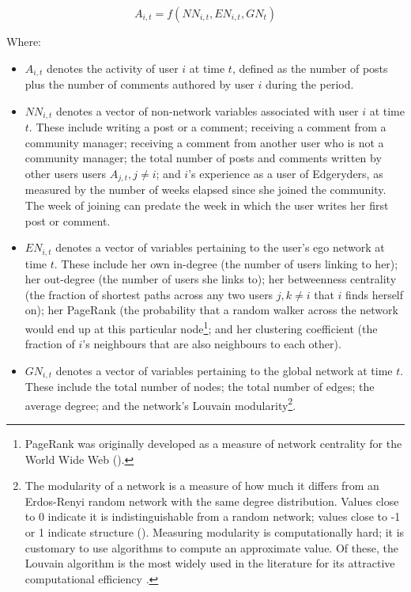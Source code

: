 \begin{equation}
	A_{i,t} = f(NN_{i,t}, EN_{i,t}, GN_t) 
	\label{eq:model}
\end{equation}

Where:
\begin{itemize}
\item $A_{i,t}$ denotes the activity of user $i$ at time $t$, defined as the number of posts plus the number of comments authored by user $i$ during the period.
\item $NN_{i,t}$ denotes a vector of non-network variables associated with user $i$ at time $t$. These include writing a post or a comment; receiving a comment from a community manager; receiving a comment from another user who is not a community manager; the total number of posts and comments written by other users users $A_{j,t}, j \neq i$; and $i$'s experience as a user of Edgeryders, as measured by the number of weeks elapsed since she joined the community. The week of joining can predate the week in which the user writes her first post or comment. 
\item $EN_{i, t}$ denotes a vector of variables pertaining to the user's ego network at time $t$. These include her own in-degree (the number of users linking to her); her out-degree (the number of users she links to); her betweenness centrality (the fraction of shortest paths across any two users $j,k \neq i$ that $i$ finds herself on); her PageRank (the probability that a random walker across the network would end up at this particular node\footnote{PageRank was originally developed as a measure of network centrality for the World Wide Web (\cite{brin2012reprint}).}; and her clustering coefficient (the fraction of $i$'s neighbours that are also neighbours to each other).
\item $GN_{i,t}$ denotes a vector of variables pertaining to the global network at time $t$. These include the total number of nodes; the total number of edges; the average degree; and the network's Louvain modularity\footnote{The modularity of a network is a measure of how much it differs from an Erdos-Renyi random network with the same degree distribution. Values close to 0 indicate it is indistinguishable from a random network; values close to -1 or 1 indicate structure (\cite{clauset2004finding}). Measuring modularity is computationally hard; it is customary to use algorithms to compute an approximate value. Of these, the Louvain algorithm is the most widely used in the literature for its attractive computational efficiency \cite{blondel2008fast}.  }.
\end{itemize}

